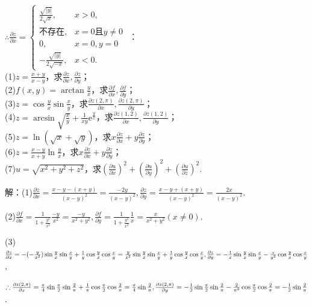 \documentclass[12pt,UTF8]{ctexart}
\begin{document}
\begin{enumerate}
$\therefore\frac{\partial z}{\partial x}=\begin{cases}
\frac{\sqrt{|y|}}{2\sqrt{x}},&x>0,\\
\text{不存在},&x=0\text{且}y\neq0\\
0,&x=0,y=0\\
-\frac{\sqrt{|y|}}{2\sqrt{-x}},&x<0.
\end{cases}$
：
\\
(1)$z=\frac{x+y}{x-y}$，求$\frac{\partial z}{\partial x},\frac{\partial z}{\partial y}$；
\\
(2)$f(x,y)=\arctan\frac yx$，求$\frac{\partial f}{\partial x},\frac{\partial f}{\partial y}$；
\\
(3)$z=\cos\frac yx\sin\frac xy$，求$\frac{\partial z(2,\pi)}{\partial x},\frac{\partial z(2,\pi)}{\partial y}$；
\\
(4)$z=\arcsin\sqrt{\frac xy}+\frac1{xy}\mathrm e^{\frac yx}$，求$\frac{\partial z(1,2)}{\partial x},\frac{\partial z(1,2)}{\partial y}$；
\\
(5)$z=\ln(\sqrt x+\sqrt y)$，求$x\frac{\partial z}{\partial x}+y\frac{\partial z}{\partial y}$；
\\
(6)$z=\frac{x-y}{x+y}\ln\frac yx$，求$x\frac{\partial z}{\partial x}+y\frac{\partial z}{\partial y}$；
\\
(7)$u=\sqrt{x^2+y^2+z^2}$，求$(\frac{\partial u}{\partial x})^2+(\frac{\partial u}{\partial y})^2+(\frac{\partial u}{\partial z})^2$.

解：(1)$\frac{\partial z}{\partial x}=\frac{x-y-(x+y)}{(x-y)^2}=\frac{-2y}{(x-y)^2},\frac{\partial z}{\partial y}=\frac{x-y+(x+y)}{(x-y)^2}=\frac{2x}{(x-y)^2}$.

(2)$\frac{\partial f}{\partial x}=\frac1{1+\frac{y^2}{x^2}}\frac{-y}{x^2}=\frac{-y}{x^2+y^2},\frac{\partial f}{\partial y}=\frac1{1+\frac{y^2}{x^2}}\frac1x=\frac x{x^2+y^2}(x\neq0)$.

(3)$\frac{\partial z}{\partial x}=-(-\frac y{x^2})\sin\frac yx\sin\frac xy+\frac1y\cos\frac yx\cos\frac xy=\frac y{x^2}\sin\frac yx\sin\frac xy+\frac1y\cos\frac yx\cos\frac xy,\\
\frac{\partial z}{\partial y}=-\frac1x\sin\frac yx\sin\frac xy-\frac x{y^2}\cos\frac yx\cos\frac xy$,

$\therefore\frac{\partial z(2,\pi)}{\partial x}=\frac\pi4\sin\frac\pi2\sin\frac2\pi+\frac1\pi\cos\frac\pi2\cos\frac2\pi=\frac\pi4\sin\frac2\pi,\\
\frac{\partial z(2,\pi)}{\partial y}=-\frac12\sin\frac\pi2\sin\frac2\pi-\frac2{\pi^2}\cos\frac\pi2\cos\frac2\pi=-\frac12\sin\frac2\pi$.


\end{enumerate}
\end{document}
